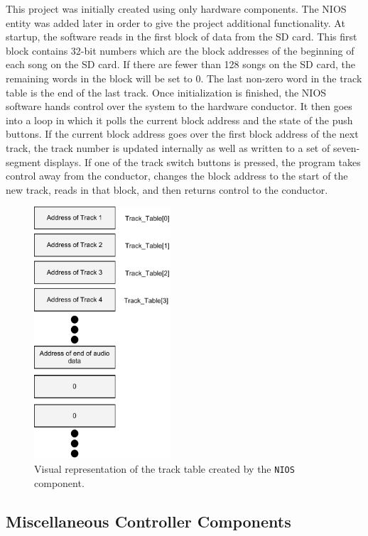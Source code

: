 \documentclass{article}
\begin{document}
This project was initially created using only hardware components. The NIOS 
entity was added later in order to give the project additional functionality. 
At startup, the software reads in the first block of data from the SD card. 
This first block contains 32-bit numbers which are the block addresses of the 
beginning of each song on the SD card. If there are fewer than 128 songs on the 
SD card, the remaining words in the block will be set to 0. The last non-zero 
word in the track table is the end of the last track. Once initialization is
finished, the NIOS software hands control over the system to the hardware
conductor. It then goes into a loop in which it polls the current block address
and the state of the push buttons. If the current block address goes over the 
first block address of the next track, the track number is updated internally
as well as written to a set of seven-segment displays. If one of the track 
switch buttons is pressed, the program takes control away from the conductor,
changes the block address to the start of the new track, reads in that block,
and then returns control to the conductor.
\begin{figure}[H]
  \centering
    \includegraphics[width=2in]{track_table_diagram}
  \caption{Visual representation of the track table created by the \texttt{NIOS} 
component.}
\end{figure}

\subsection{Miscellaneous Controller Components}
\end{document}
